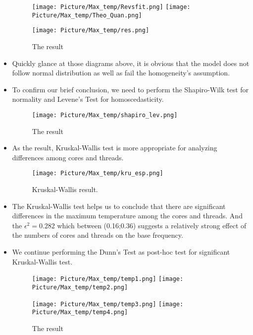 \documentclass[a4paper]{article}
\begin{document}
\begin{itemize}
    \begin{figure}[H]
        \centering
        \texttt{[image: Picture/Max\_temp/Revsfit.png]}
        \texttt{[image: Picture/Max\_temp/Theo\_Quan.png]}
    \end{figure}
    
    \begin{figure}[H]
        \centering
        \texttt{[image: Picture/Max\_temp/res.png]}
        \caption{The result}
    \end{figure}
    
    \item[] Quickly glance at those diagrams above, it is obvious that the model does not follow normal distribution as well as fail the homogeneity's assumption.
    
    \item[] To confirm our brief conclusion, we need to perform the Shapiro-Wilk test for normality and Levene's Test for homoscedasticity.
    
    \begin{figure}[H]
        \centering
        \texttt{[image: Picture/Max\_temp/shapiro\_lev.png]}
        \caption{The result}
    \end{figure}
    
    \item[] As the result, Kruskal-Wallis test is more appropriate for analyzing differences among cores and threads.
    
    \begin{figure}[H]
        \centering
        \texttt{[image: Picture/Max\_temp/kru\_esp.png]}
        \caption{Kruskal-Wallis result.}
    \end{figure}
    
     \item[] The Kruskal-Wallis test helps us to conclude that there are significant differences in the maximum temperature among the cores and threads. And the $\epsilon^2 = 0.282$ which between (0.16;0.36) suggests a relatively strong effect of the numbers of cores and threads on the base frequency.
     
    \item[] We continue performing the Dunn's Test as post-hoc test for significant Kruskal-Wallis test.
    
    \begin{figure}[H]
        \centering
        \texttt{[image: Picture/Max\_temp/temp1.png]}
        \hfill
        \texttt{[image: Picture/Max\_temp/temp2.png]}
    \end{figure}
    
    \begin{figure}[H]
        \centering
        \texttt{[image: Picture/Max\_temp/temp3.png]}
        \hfill
        \texttt{[image: Picture/Max\_temp/temp4.png]}
        \caption{The result}
    \end{figure}
\end{itemize}
\end{document}
